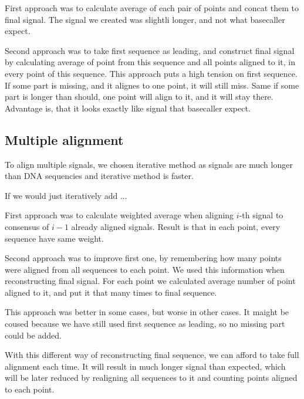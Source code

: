 First approach was to calculate average of each pair of points and concat them to final signal. The signal we created
was slightli longer, and not what basecaller expect.

Second approach was to take first sequence as leading, and construct final signal by calculating average of point from this sequence and all points aligned to it, in every point of this sequence. This approach puts a high tension on first sequence.
If some part is missing, and it alignes to one point, it will still miss. Same if some part is longer than should, one point will align to it, and it will stay there. Advantage is, that it looks exactly like signal that basecaller expect.

\subsection{Multiple alignment}

To align multiple signals, we chosen iterative method as signals are much longer than DNA sequencies and iterative method is faster.

If we would just iteratively add ...

First approach was to calculate weighted average when aligning $i$-th signal to consensus of $i-1$ already aligned signals. 
Result is that in each point, every sequence have same weight.

Second approach was to improve first one, by remembering how many points were aligned from all sequences to each point. We used
this information when reconstructing final signal. For each point we calculated average number of point aligned to it, and put it that many times to final sequence.

This approach was better in some cases, but worse in other cases. It maight be coused because we have still used first sequence as leading, so no missing part could be added.

With this different way of reconstructing final sequence, we can afford to take full alignment each time. 
It will result in much longer signal than expected, which will be later reduced by realigning all sequences to it and counting 
points aligned to each point.